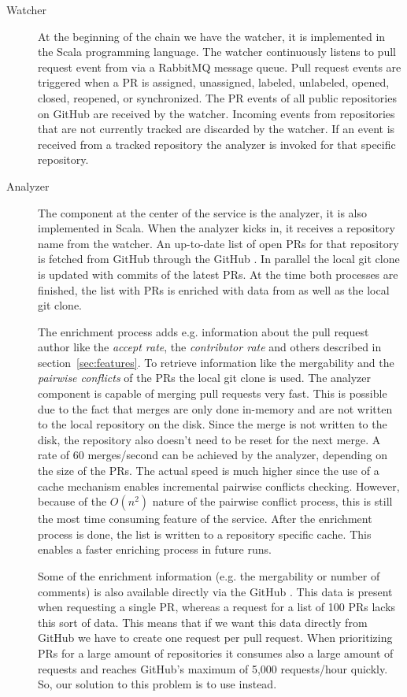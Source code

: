 \begin{description}
\item[Watcher]
At the beginning of the chain we have the watcher, it is implemented in the Scala programming language.
The watcher continuously listens to pull request event from \ghtorrent via a RabbitMQ message queue.
Pull request events are triggered when a PR is assigned, unassigned, labeled, unlabeled, opened, closed, reopened, or synchronized.
The PR events of all public repositories on GitHub are received by the watcher.
Incoming events from repositories that are not currently tracked are discarded by the watcher.
If an event is received from a tracked repository the analyzer is invoked for that specific repository.

\item[Analyzer]
The component at the center of the service is the analyzer, it is also implemented in Scala.
When the analyzer kicks in, it receives a repository name from the watcher.
An up-to-date list of open PRs for that repository is fetched from GitHub through the GitHub \api.
In parallel the local git clone is updated with commits of the latest PRs.
At the time both processes are finished, the list with PRs is enriched with data from \ghtorrent as well as the local git clone.

The enrichment process adds e.g. information about the pull request author like the \emph{accept rate}, the \emph{contributor rate} and others described in section~\ref{sec:features}.
To retrieve information like the mergability and the \emph{pairwise conflicts} of the PRs the local git clone is used.
The analyzer component is capable of merging pull requests very fast.
This is possible due to the fact that merges are only done in-memory and are not written to the local repository on the disk.
Since the merge is not written to the disk, the repository also doesn't need to be reset for the next merge.
A rate of 60 merges/second can be achieved by the analyzer, depending on the size of the PRs.
The actual speed is much higher since the use of a cache mechanism enables incremental pairwise conflicts checking.
However, because of the $O(n^2)$ nature of the pairwise conflict process, this is still the most time consuming feature of the service.
After the enrichment process is done, the list is written to a repository specific cache.
This enables a faster enriching process in future runs.

Some of the enrichment information (e.g. the mergability or number of comments) is also available directly via the GitHub \api.
This data is present when requesting a single PR, whereas a request for a list of 100 PRs lacks this sort of data.
This means that if we want this data directly from GitHub we have to create one \api request per pull request.
When prioritizing PRs for a large amount of repositories it consumes also a large amount of \api requests and reaches GitHub's maximum of 5,000 requests/hour quickly.
So, our solution to this problem is to use \ghtorrent instead.


\end{description}
